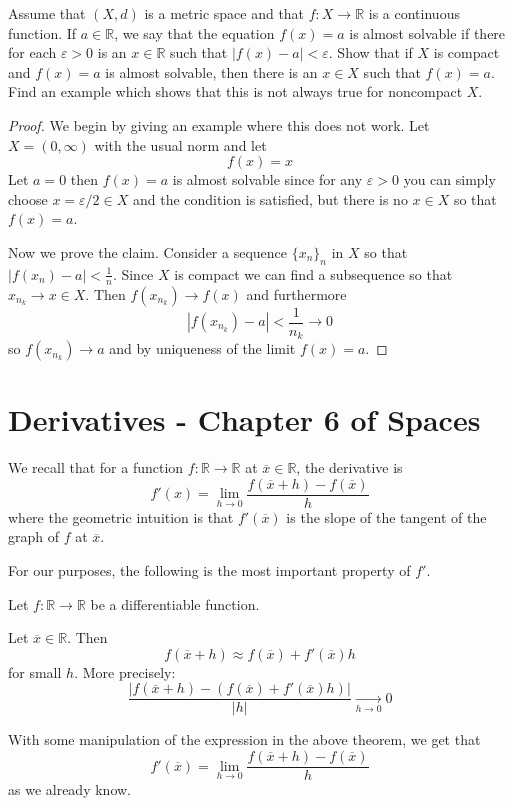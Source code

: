 \begin{prob}
    Assume that $(X,d)$ is a metric space and that 
    $f : X \to \mathbb R$ is a continuous function.
    If $a \in \mathbb R$, we say that the equation 
    $f(x) = a$ is almost solvable if there for each 
    $\varepsilon > 0$ is an $x \in \mathbb R$ such that 
    $|f(x) - a| < \varepsilon$. Show that if 
    $X$ is compact and $f(x) = a$ is almost solvable, then 
    there is an $x \in X$ such that $f(x) = a$.
    Find an example which shows that this is not always true 
    for noncompact $X$.
\end{prob}
\begin{proof}
    We begin by giving an example where this does not work. 
    Let $X = (0,\infty)$ with the usual norm and let 
    \[
        f(x) = x
    \]
    Let $a = 0$ then $f(x) = a$ is almost solvable since 
    for any $\varepsilon > 0$ you can simply choose 
    $x = \varepsilon/2 \in X$
    and the condition is satisfied, but there is no 
    $x \in X$ so that $f(x) = a$.

    Now we prove the claim. Consider a sequence 
    $\{x_n\}_n$ in $X$ so that $|f(x_n) - a| < \frac{1}{n}$.
    Since $X$ is compact we can find a subsequence so that 
    $x_{n_k} \to x \in X$. Then $f(x_{n_k}) \to f(x)$ and furthermore 
    \[
        |f(x_{n_k}) - a| < \frac{1}{n_{k}} \to 0
    \]
    so $f(x_{n_k}) \to a$ and by uniqueness of the limit 
    $f(x) = a$.
\end{proof}

\newpage 
\section{Derivatives - Chapter 6 of Spaces}
We recall that for a function $f: \mathbb R \to \mathbb R$ 
at $\overline x \in \mathbb R$, the derivative is 
\[
    f'(x) = \lim_{h\to0} \frac{f(\overline x + h) - f(\overline x)}{h}
\]
where the geometric intuition is that $f'(\overline x)$ is the 
slope of the tangent of the graph of $f$ at $\overline x$.

For our purposes, the following is the most important property 
of $f'$.
\begin{thm}
    Let $f : \mathbb R \to \mathbb R$ be a differentiable 
    function. 

    Let $\overline x \in \mathbb R$. Then 
    \[
        f(\overline x + h) 
        \approx f(\overline x) + f'(\overline x)h
    \]
    for small $h$.
    More precisely: 
    \[
        \frac{\left|f(\overline x + h) - (f(\overline x) 
        + f'(\overline x)h)\right|}{|h|} \underset{h\to 0}{\to} 0
    \]
\end{thm}
With some manipulation of the expression in the above 
theorem, we get that 
\[
    f'(\overline x) = 
    \lim_{h\to 0}\frac{f(\overline x + h) - f(\overline x)}{h}
\]
as we already know.

